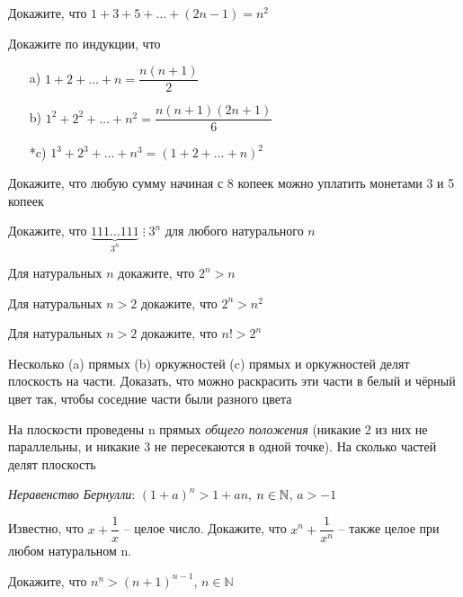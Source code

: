 \documentclass{article}
\begin{document}
    \begin{enumerate_boxed}

        \item Докажите, что $1 + 3 + 5 + \dots + (2n - 1) = n^2$

        \item Докажите по индукции, что
        \begin{enumerate}
            \item[a)] $1 + 2 + \dots + n =\dfrac{n (n+1)}{2}$

            \item[b)] $1^2 + 2^2 + \dots + n^2 =\dfrac{n (n+1)(2n + 1)}{6}$

            \item[*c)] $1^3 + 2^3 + \dots + n^3 =(1 + 2 + \dots + n) ^ 2$
        \end{enumerate}

        \item Докажите, что любую сумму начиная с 8 копеек можно уплатить монетами 3 и 5 копеек

        \item Докажите, что $\underbrace{111\dots111}_{3^n}\;\vdots\; 3^n$ для любого натурального $n$

        \item Для натуральных $n$ докажите, что $2^n > n$

        \item Для натуральных $n > 2$ докажите, что $2^n > n^2$

        \item Для натуральных $n > 2$ докажите, что $n! > 2^n$

        \item Несколько (a) прямых (b) оркужностей (c) прямых и оркужностей делят плоскость на части.
        Доказать, что можно раскрасить эти части в белый и чёрный цвет так, чтобы соседние части были разного цвета

        \item На плоскости проведены n прямых \textit{общего положения} (никакие 2 из них не параллельны, и никакие 3 не пересекаются в одной точке).
        На сколько частей делят плоскость

        \item \textit{Неравенство Бернулли}: $(1+a)^n>1+an$, $n \in \mathbb{N}$, $a > - 1$

        \item Известно, что  $x + \dfrac{1}{x}$  – целое число.
        Докажите, что  $x^n + \dfrac{1}{x^n}$  – также целое при любом натуральном n.

        \item Докажите, что $n^n > (n + 1)^{n - 1}$, $n \in \mathbb{N}$


    \end{enumerate_boxed}
\end{document}
